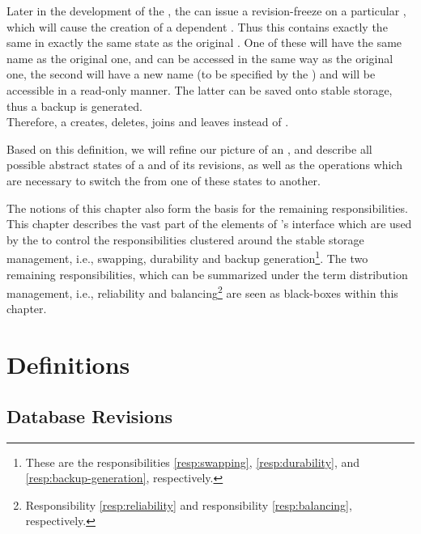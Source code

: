 \documentclass[a4paper, 12pt]{book}
\begin{document}
%
Later in the development of the , the  can
issue a revision-freeze on a particular , which will
cause the creation of a dependent . Thus this
 contains exactly the same  in exactly the
same state as the original . One of these 
will have the same name as the original one, and can be accessed in
the same way as the original one, the second  will have a
new name (to be specified by the ) and will be accessible
in a read-only manner. The latter  can be saved onto
stable storage, thus a backup is generated.\\
%
Therefore, a  creates, deletes, joins and leaves
 instead of .

Based on this definition, we will refine our picture of an
, and describe all possible abstract states of a
 and of its revisions, as well as the operations which
are necessary to switch the \SYNEIGHT from one of these states to
another.

The notions of this chapter also form the basis for the remaining
responsibilities. This chapter describes the vast part of the elements of
\SYNEIGHT's interface which are used by the  to control the
responsibilities clustered around the stable storage management, i.e.,
swapping, durability and backup generation\footnote{These are the
  responsibilities \vref{resp:swapping}, \vref{resp:durability}, and
  \vref{resp:backup-generation}, respectively.}.
%
The two remaining responsibilities, which can be summarized under the
term distribution management, i.e., reliability and
balancing\footnote{Responsibility \vref{resp:reliability} and responsibility
  \vref{resp:balancing}, respectively.}
%
are seen as black-boxes within this chapter. 

\section{Definitions}



\subsection{Database Revisions}
\end{document}
